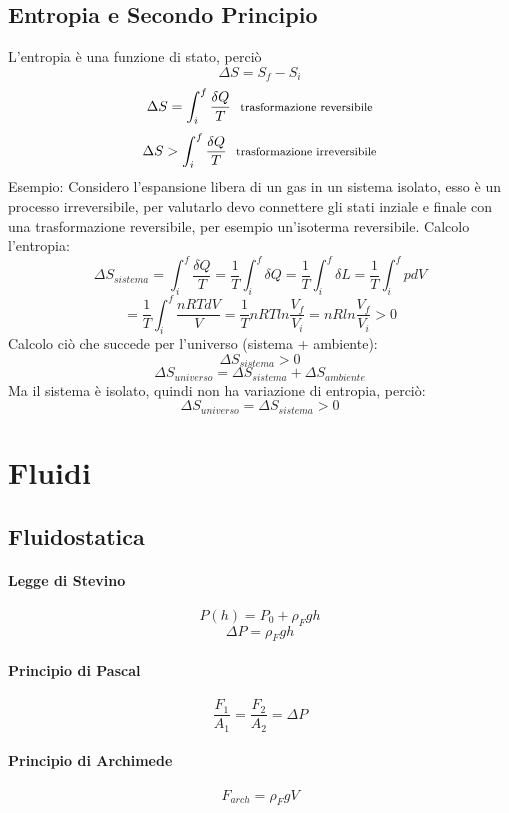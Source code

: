 \documentclass[12pt]{article}
\begin{document}
    \subsection{Entropia e Secondo Principio}
        L'entropia è una funzione di stato, perciò
        \[\Delta S = S_f - S_i\]
        \[\Delta S = \int_{i}^{f} \frac{\delta Q}{T}  \:\:\:\text{\footnotesize{trasformazione 
        reversibile}}\]
        \[\Delta S > \int_{i}^{f} \frac{\delta Q}{T}  \:\:\:\text{\footnotesize{trasformazione 
        irreversibile}}\]
        Esempio:
        Considero l'espansione libera di un gas in un sistema isolato, esso è un processo irreversibile, 
        per valutarlo devo connettere gli stati inziale e finale con una trasformazione reversibile, per esempio un'isoterma reversibile.
        \newline
        Calcolo l'entropia:
        \[\Delta S_{sistema} = \int_{i}^{f} \frac{\delta Q}{T} = \frac{1}{T} \int_{i}^{f}{\delta Q} = \frac{1}{T} \int_{i}^{f}{\delta L} = \frac{1}{T} \int_{i}^{f}{pdV} \]
        \[= \frac{1}{T} \int_{i}^{f}{\frac{nRTdV}{V}} = \frac{1}{T} nRT ln{\frac{V_f}{V_i}} = nRln{\frac{V_f}{V_i}} > 0\]
        Calcolo ciò che succede per l'universo (sistema + ambiente):
        \[\Delta S_{sistema} > 0\]
        \[\Delta S_{universo} = \Delta S_{sistema} + \Delta S_{ambiente} \]
        Ma il sistema è isolato, quindi non ha variazione di entropia, perciò:
        \[\Delta S_{universo} = \Delta S_{sistema} > 0\]
\newpage
    \section{Fluidi}
    \subsection{Fluidostatica}
    \paragraph*{Legge di Stevino}
    \[P(h) = P_0 + \rho_{F} g h\]
    \[\Delta P = \rho_{F} g h\]
    \paragraph*{Principio di Pascal}
    \[\frac{F_1}{A_1} = \frac{F_2}{A_2} = \Delta P\]
    \paragraph*{Principio di Archimede}
    \[F_{arch} = \rho_{F} g V\]
\end{document}
